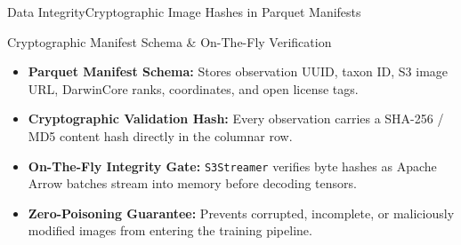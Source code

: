 \begin{frame}{Data Integrity}{Cryptographic Image Hashes in Parquet Manifests}
    \begin{block}{Cryptographic Manifest Schema \& On-The-Fly Verification}
        \begin{itemize}\small
            \item \textbf{Parquet Manifest Schema:} Stores observation UUID, taxon ID, S3 image URL, DarwinCore ranks, coordinates, and open license tags.
            \item \textbf{Cryptographic Validation Hash:} Every observation carries a SHA-256 / MD5 content hash directly in the columnar row.
            \item \textbf{On-The-Fly Integrity Gate:} \texttt{S3Streamer} verifies byte hashes as Apache Arrow batches stream into memory before decoding tensors.
            \item \textbf{Zero-Poisoning Guarantee:} Prevents corrupted, incomplete, or maliciously modified images from entering the training pipeline.
        \end{itemize}
    \end{block}


\end{frame}


